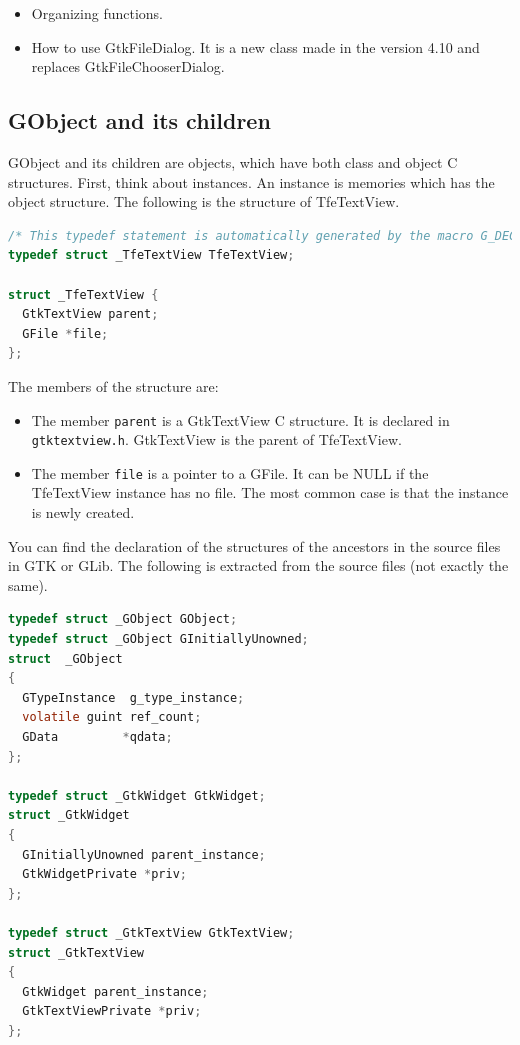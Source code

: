 \begin{itemize}
\tightlist
\item
  Organizing functions.
\item
  How to use GtkFileDialog. It is a new class made in the version 4.10
  and replaces GtkFileChooserDialog.
\end{itemize}

\subsection{GObject and its children}\label{gobject-and-its-children}

GObject and its children are objects, which have both class and object C
structures. First, think about instances. An instance is memories which
has the object structure. The following is the structure of TfeTextView.

\begin{lstlisting}[language=C]
/* This typedef statement is automatically generated by the macro G_DECLARE_FINAL_TYPE */
typedef struct _TfeTextView TfeTextView;

struct _TfeTextView {
  GtkTextView parent;
  GFile *file;
};
\end{lstlisting}

The members of the structure are:

\begin{itemize}
\tightlist
\item
  The member \passthrough{\lstinline!parent!} is a GtkTextView C
  structure. It is declared in \passthrough{\lstinline!gtktextview.h!}.
  GtkTextView is the parent of TfeTextView.
\item
  The member \passthrough{\lstinline!file!} is a pointer to a GFile. It
  can be NULL if the TfeTextView instance has no file. The most common
  case is that the instance is newly created.
\end{itemize}

You can find the declaration of the structures of the ancestors in the
source files in GTK or GLib. The following is extracted from the source
files (not exactly the same).

\begin{lstlisting}[language=C]
typedef struct _GObject GObject;
typedef struct _GObject GInitiallyUnowned;
struct  _GObject
{
  GTypeInstance  g_type_instance;
  volatile guint ref_count;
  GData         *qdata;
};

typedef struct _GtkWidget GtkWidget;
struct _GtkWidget
{
  GInitiallyUnowned parent_instance;
  GtkWidgetPrivate *priv;
};

typedef struct _GtkTextView GtkTextView;
struct _GtkTextView
{
  GtkWidget parent_instance;
  GtkTextViewPrivate *priv;
};
\end{lstlisting}

